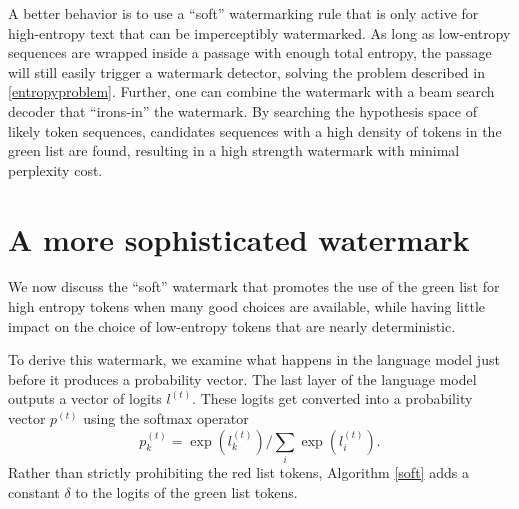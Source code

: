 \documentclass{article}
\theoremstyle{plain}
\theoremstyle{definition}
\theoremstyle{remark}
\begin{document}
A better behavior is to use a ``soft'' watermarking rule that is only active for high-entropy text that can be imperceptibly watermarked. As long as low-entropy sequences are wrapped inside a passage with enough total entropy, the passage will still easily trigger a watermark detector, solving the problem described in \cref{entropyproblem}. 
Further, one can combine the watermark with a beam search decoder that ``irons-in'' the watermark. By searching the hypothesis space of likely token sequences, 
candidates sequences with a high density of tokens in the green list are found, resulting in a high strength watermark with minimal perplexity cost.

\section{A more sophisticated watermark}\label{sec:soft-watermark}
We now discuss the ``soft'' watermark that promotes the use of the green list for high entropy tokens when many good choices are available, while having little impact on the choice of low-entropy tokens that are nearly deterministic. 

To derive this watermark, we examine what happens in the language model just before it produces a probability vector. The last layer of the language model outputs a vector of logits $l^{(t)}$.  These logits get converted into a probability vector $p^{(t)}$ using the softmax operator
 $$p^{(t)}_k = \exp(l^{(t)}_k)/\sum_i \exp(l^{(t)}_i).$$
%
Rather than strictly prohibiting the red list tokens, Algorithm \ref{soft} adds a constant $\delta$ to the logits of the green list tokens. 
\end{document}
